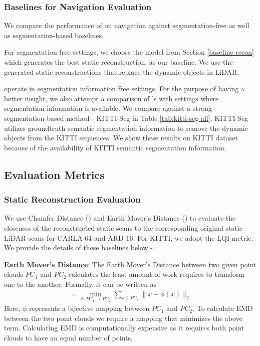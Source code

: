 \subsubsection{Baselines for Navigation Evaluation}
\label{baseline-slam-eval}

We compare the performance of \dslr{} on navigation against segmentation-free as well as segmentation-based baselines.


For segmentation-free settings, we choose the model from Section \ref{baseline-recon} which generates the best static reconstruction, as our baseline. We use the generated static reconstructions that replace the dynamic objects in LiDAR.
 
\dslr{} operate in segmentation information free settings. For the purpose of having a better insight, we also attempt a comparison of \dslr{}'s with settings where segmentation information is available. We compare \dslr{} against a strong segmentation-based method - KITTI-Seg in Table \ref{tab:kitti-seg-all}.  KITTI-Seg utilizes groundtruth semantic segmentation information to remove the dynamic objects from the KITTI sequences. We show these results on KITTI dataset because of the availability of KITTI semantic segmentation information.


\subsection{Evaluation Metrics}
\label{metrics}
\subsubsection{Static Reconstruction Evaluation}
\label{metrics}
We use Chamfer Distance (\citet{fan2017point}) and Earth Mover's Distance (\citet{emd-cd}) to evaluate the closeness of the reconstructed static scans to the corresponding original static LiDAR scans for CARLA-64 and ARD-16. For KITTI, we adopt the LQI metric. We provide the details of these baselines below -

\textbf{Earth Mover's Distance}: The Earth Mover's Distance between two given point clouds $PC_1$ and $PC_2$ calculates the least amount of work requires to transform one to the another.
    Formally, it can be written as
    \begin{equation}
    \begin{split}
        =\min _{\phi: PC_{1} \longrightarrow PC_{2}} \sum_{x \in PC_{1}}\|x-\phi(x)\|_{2}
            \end{split}
        \end{equation}
        Here, $\phi$ represents a bijective mapping between $PC_{1}$ and $PC_{2}$. 
    To calculate EMD between the two point clouds  we require a mapping that minimizes the above term. Calculating EMD is computationally expensive as it requires both point clouds to have an equal number of points.


